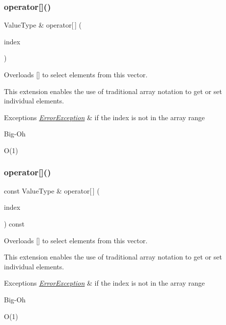 \subsubsection{\texorpdfstring{operator[]()}{operator[]()}\hspace{0.1cm}{\footnotesize\ttfamily [1/2]}}
{\footnotesize\ttfamily Value\+Type \& operator\mbox{[}$\,$\mbox{]} (\begin{DoxyParamCaption}\item[{int}]{index }\end{DoxyParamCaption})}



Overloads {\ttfamily \mbox{[}\mbox{]}} to select elements from this vector. 

This extension enables the use of traditional array notation to get or set individual elements. 
\begin{DoxyExceptions}{Exceptions}
{\em \mbox{\hyperlink{classErrorException}{Error\+Exception}}} & if the index is not in the array range \\
\hline
\end{DoxyExceptions}
\begin{DoxyRefDesc}{Big-\/\+Oh}
\item[\mbox{\hyperlink{BigOh__BigOh000137}{Big-\/\+Oh}}]O(1) \end{DoxyRefDesc}
\mbox{\label{classVector_a1b5a4ea461655cbe512ab976aad8d809}} 
\subsubsection{\texorpdfstring{operator[]()}{operator[]()}\hspace{0.1cm}{\footnotesize\ttfamily [2/2]}}
{\footnotesize\ttfamily const Value\+Type \& operator\mbox{[}$\,$\mbox{]} (\begin{DoxyParamCaption}\item[{int}]{index }\end{DoxyParamCaption}) const}



Overloads {\ttfamily \mbox{[}\mbox{]}} to select elements from this vector. 

This extension enables the use of traditional array notation to get or set individual elements. 
\begin{DoxyExceptions}{Exceptions}
{\em \mbox{\hyperlink{classErrorException}{Error\+Exception}}} & if the index is not in the array range \\
\hline
\end{DoxyExceptions}
\begin{DoxyRefDesc}{Big-\/\+Oh}
\item[\mbox{\hyperlink{BigOh__BigOh000138}{Big-\/\+Oh}}]O(1) \end{DoxyRefDesc}
\mbox{\label{classVector_ab48f65e37130b674bc0f6220cbb59491}} 
